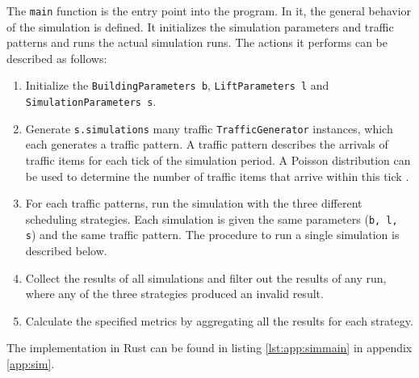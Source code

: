 The \texttt{main} function is the entry point into the program.
In it, the general behavior of the simulation is defined.
It initializes the simulation parameters and traffic patterns and runs the actual simulation runs.
The actions it performs can be described as follows:
\begin{enumerate}
    \item Initialize the \texttt{BuildingParameters b}, \texttt{LiftParameters l} and\\ \texttt{SimulationParameters s}.
    \item Generate \texttt{s.simulations} many traffic \texttt{TrafficGenerator} instances, which each generates a traffic pattern. A traffic pattern describes the arrivals of traffic items for each tick of the simulation period. A Poisson distribution can be used to determine the number of traffic items that arrive within this tick \autocite{beers2015arrivals}.
    \item For each traffic patterns, run the simulation with the three different scheduling strategies. Each simulation is given the same parameters (\texttt{b, l, s}) and the same traffic pattern. The procedure to run a single simulation is described below.
    \item Collect the results of all simulations and filter out the results of any run, where any of the three strategies produced an invalid result.
    \item Calculate the specified metrics by aggregating all the results for each strategy.
\end{enumerate}
The implementation in Rust can be found in listing \ref{lst:app:simmain} in appendix \ref{app:sim}.

